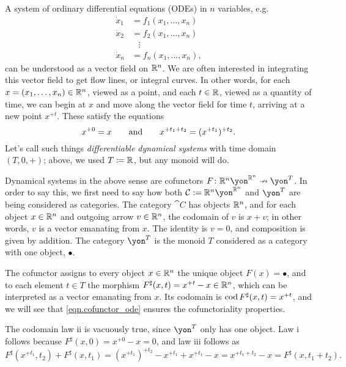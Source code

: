 \documentclass[Book-Poly]{subfiles}
\begin{document}
\begin{example}
A system of ordinary differential equations (ODEs) in $n$ variables, e.g.
\begin{align*}
    \dot{x}_1 &= f_1(x_1, \ldots, x_n) \\
    \dot{x}_2 &= f_2(x_1, \ldots, x_n) \\
    & \; \; \; \vdots \\
    \dot{x}_n &= f_n(x_1, \ldots, x_n),
\end{align*}
can be understood as a vector field on $\mathbb{R}^n$.
We are often interested in integrating this vector field to get flow lines, or integral curves.
In other words, for each $x=(x_1, \ldots, x_n)\in\mathbb{R}^n$, viewed as a point, and each $t\in\mathbb{R}$, viewed as a quantity of time, we can begin at $x$ and move along the vector field for time $t$, arriving at a new point $x^{+t}$. These satisfy the equations
\begin{equation} \label{eqn.cofunctor_ode}
    x^{+0} = x \qquad\text{and}\qquad x^{+t_1+t_2} = (x^{+t_1})^{+t_2}.
\end{equation}
Let's call such things \emph{differentiable dynamical systems} with time domain $(T, 0, +)$; above, we used $T\coloneqq\mathbb{R}$, but any monoid will do.

Dynamical systems in the above sense are cofunctors $F \colon \rr^n \yon^{\rr^n} \cof \yon^T$.
In order to say this, we first need to say how both $\cat{C} := \rr^n \yon^{\rr^n}$ and $\yon^T$ are being considered as categories.
The category $\cat{C}$ has objects $\mathbb{R}^n$, and for each object $x \in \mathbb{R}^n$ and outgoing arrow $v \in \mathbb{R}^n$, the codomain of $v$ is $x + v$; in other words, $v$ is a vector emanating from $x$.
The identity is $v = 0$, and composition is given by addition.
The category $\yon^T$ is the monoid $T$ considered as a category with one object, $\bullet$.

The cofunctor assigns to every object $x \in \mathbb{R}^n$ the unique object $F(x) = \bullet$, and to each element $t \in T$ the morphism $F^\sharp(x, t) = x^{+t} - x \in \mathbb{R}^n$, which can be interpreted as a vector emanating from $x$.
Its codomain is $\operatorname{cod} F^\sharp(x, t) = x^{+t}$, and we will see that \eqref{eqn.cofunctor_ode} ensures the cofunctoriality properties.

The codomain law ii is vacuously true, since $\yon^T$ only has one object.
Law i follows because $F^\sharp(x, 0) = x^{+0} - x = 0$, and law iii follows as
\[
    F^\sharp(x^{+t_1}, t_2) + F^\sharp(x, t_1) = (x^{+t_1})^{+t_2} - x^{+t_1} + x^{+t_1} - x = x^{+t_1 + t_2} - x = F^\sharp(x, t_1+t_2).
\]
\end{example}
\end{document}
